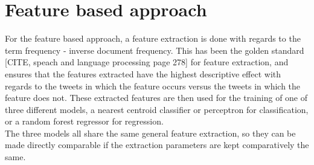 
\section{Feature based approach}

For the feature based approach, a feature extraction is done with regards to the term frequency - inverse document frequency. This has been the golden standard [CITE, speach and language processing page 278] for feature extraction, and ensures that the features extracted have the highest descriptive effect with regards to the tweets in which the feature occurs versus the tweets in which the feature does not. These extracted features are then used for the training of one of three different models, a nearest centroid classifier or perceptron for classification, or a random forest regressor for regression.\\
The three models all share the same general feature extraction, so they can be made directly comparable if the extraction parameters are kept comparatively the same. 